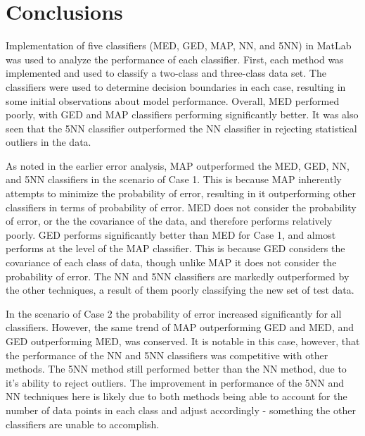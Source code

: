 \documentclass[article, 1.5space, letterpaper, 12pt, oneside, header, footer]{SydeClass}
\begin{document}


\section{Conclusions}
Implementation of five classifiers (MED, GED, MAP, NN, and 5NN) in MatLab was used to analyze the performance of each classifier. First, each method was implemented and used to classify a two-class and three-class data set. The classifiers were used to determine decision boundaries in each case, resulting in some initial observations about model performance. Overall, MED performed poorly, with GED and MAP classifiers performing significantly better. It was also seen that the 5NN classifier outperformed the NN classifier in rejecting statistical outliers in the data.

As noted in the earlier error analysis, MAP outperformed the MED, GED, NN, and 5NN classifiers in the scenario of Case 1. This is because MAP inherently attempts to minimize the probability of error, resulting in it outperforming other classifiers in terms of probability of error. MED does not consider the probability of error, or the the covariance of the data, and therefore performs relatively poorly. GED performs significantly better than MED for Case 1, and almost performs at the level of the MAP classifier. This is because GED considers the covariance of each class of data, though unlike MAP it does not consider the probability of error. The NN and 5NN classifiers are markedly outperformed by the other techniques, a result of them poorly classifying the new set of test data.

In the scenario of Case 2 the probability of error increased significantly for all classifiers. However, the same trend of MAP outperforming GED and MED, and GED outperforming MED, was conserved. It is notable in this case, however, that the performance of the NN and 5NN classifiers was competitive with other methods. The 5NN method still performed better than the NN method, due to it's ability to reject outliers. The improvement in performance of the 5NN and NN techniques here is likely due to both methods being able to account for the number of data points in each class and adjust accordingly - something the other classifiers are unable to accomplish.






\end{document}
